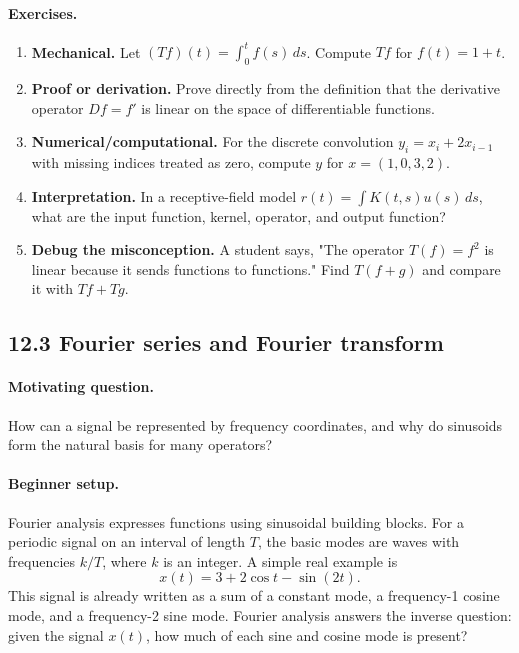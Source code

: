 \paragraph{Exercises.}
\begin{enumerate}[label=\textbf{12.2.\arabic*.}, leftmargin=*]
\item \textbf{Mechanical.} Let \((Tf)(t)=\int_0^t f(s)\,ds\). Compute \(Tf\) for \(f(t)=1+t\).
\item \textbf{Proof or derivation.} Prove directly from the definition that the derivative operator \(D f=f'\) is linear on the space of differentiable functions.
\item \textbf{Numerical/computational.} For the discrete convolution \(y_i=x_i+2x_{i-1}\) with missing indices treated as zero, compute \(y\) for \(x=(1,0,3,2)\).
\item \textbf{Interpretation.} In a receptive-field model \(r(t)=\int K(t,s)u(s)\,ds\), what are the input function, kernel, operator, and output function?
\item \textbf{Debug the misconception.} A student says, "The operator \(T(f)=f^2\) is linear because it sends functions to functions." Find \(T(f+g)\) and compare it with \(Tf+Tg\).
\end{enumerate}

\subsection{12.3 Fourier series and Fourier transform}

\paragraph{Motivating question.}
How can a signal be represented by frequency coordinates, and why do sinusoids form the natural basis for many operators?

\paragraph{Beginner setup.}
Fourier analysis expresses functions using sinusoidal building blocks. For a periodic signal on an interval of length \(T\), the basic modes are waves with frequencies \(k/T\), where \(k\) is an integer. A simple real example is
\[
x(t)=3+2\cos t-\sin(2t).
\]
This signal is already written as a sum of a constant mode, a frequency-1 cosine mode, and a frequency-2 sine mode. Fourier analysis answers the inverse question: given the signal \(x(t)\), how much of each sine and cosine mode is present?

